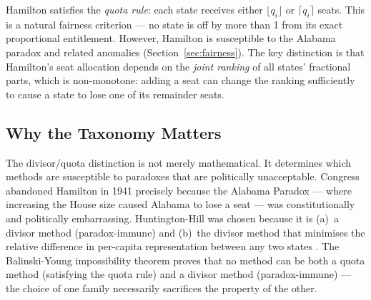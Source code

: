 Hamilton satisfies the \emph{quota rule}: each state receives either
$\lfloor q_i \rfloor$ or $\lceil q_i \rceil$ seats.
This is a natural fairness criterion --- no state is off by more than 1
from its exact proportional entitlement.
However, Hamilton is susceptible to the Alabama paradox and related
anomalies (Section~\ref{sec:fairness}).
The key distinction is that Hamilton's seat allocation depends on the
\emph{joint ranking} of all states' fractional parts, which is
non-monotone: adding a seat can change the ranking sufficiently to
cause a state to lose one of its remainder seats.

\subsection{Why the Taxonomy Matters}

The divisor/quota distinction is not merely mathematical.
It determines which methods are susceptible to paradoxes that are
politically unacceptable.
Congress abandoned Hamilton in 1941 precisely because the Alabama Paradox
--- where increasing the House size caused Alabama to lose a seat ---
was constitutionally and politically embarrassing.
Huntington-Hill was chosen because it is (a)~a divisor method
(paradox-immune) and (b)~the divisor method that minimises the relative
difference in per-capita representation between any two states
\citep{huntington1928method}.
The Balinski-Young impossibility theorem \citep{balinski1982fair} proves
that no method can be both a quota method (satisfying the quota rule)
and a divisor method (paradox-immune) --- the choice of one family
necessarily sacrifices the property of the other.
